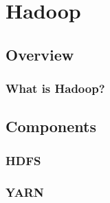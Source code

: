 \section{Hadoop}
\subsection{Overview}
\begin{frame}
\frametitle{What is Hadoop?} 
\end{frame}
\subsection{Components}
\begin{frame}
\frametitle{HDFS} 
\end{frame}
\begin{frame}
\frametitle{YARN} 
\end{frame}
